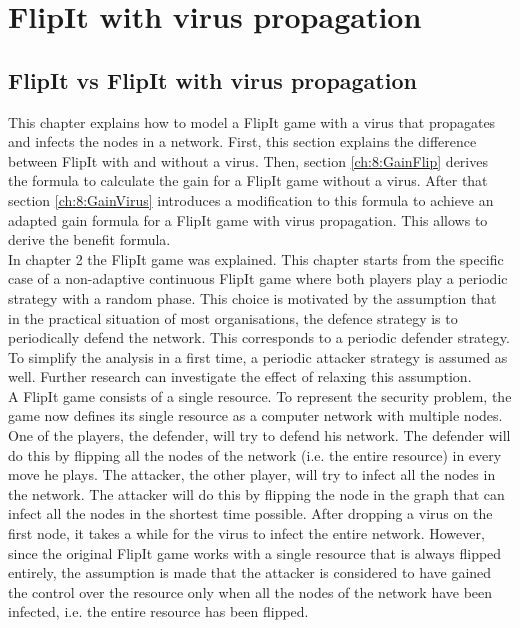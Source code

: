 \chapter{FlipIt with virus propagation }
\label{cha:6}


\section{FlipIt vs FlipIt with virus propagation}

This chapter explains how to model a FlipIt game with a virus that propagates and infects the nodes in a network. First, this section explains the difference between FlipIt with and without a virus. 
Then, section \ref{ch:8:GainFlip} derives the formula to calculate the gain for a FlipIt game without a virus. After that section \ref{ch:8:GainVirus} introduces a modification to this formula to achieve an adapted gain formula for a FlipIt game with virus propagation. This allows to derive the benefit formula.\\


In chapter 2 the FlipIt game was explained.  This chapter starts from the specific case of a non-adaptive continuous FlipIt game where both players play a periodic strategy with a random phase. This choice is motivated by the assumption that in the practical situation of most organisations, the defence strategy is to periodically defend the network. This corresponds to a periodic defender strategy. To simplify the analysis in a first time, a periodic attacker strategy is assumed as well. Further research can investigate the effect of relaxing this assumption.\\


A FlipIt game consists of a single resource. To represent the security problem, the game now defines its single resource as a computer network with multiple
nodes. One of the players, the defender, will try to defend his network. The defender
will do this by flipping all the nodes of the network (i.e. the entire resource) in every move he plays. The
attacker, the other player, will try to infect all the nodes in the network. The attacker
will do this by flipping the node in the graph that can infect all the nodes in the
shortest time possible. After dropping a virus on the first node, it takes a while for the virus to infect the entire network. However, since the original FlipIt game works with a single resource that is always flipped entirely, the assumption is made that the attacker is considered to have gained the control over the resource only when all the nodes of the network have been infected, i.e. the entire resource has been flipped. 



